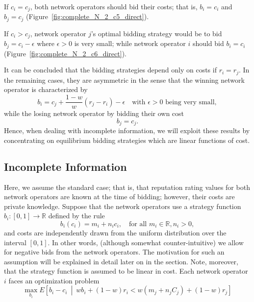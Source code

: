 If $c_i = c_j$, both network operators should bid their costs; that is, $b_i = c_i$ and $b_j = c_j$ (Figure~\ref{fig:complete_N_2_c5_direct}).

If $c_i > c_j$, network operator $j$'s optimal bidding strategy would be to bid $b_j = c_i - \epsilon$ where $\epsilon>0$ is very small; while network operator $i$ should bid $b_i = c_i$ (Figure~\ref{fig:complete_N_2_c6_direct}).

It can be concluded that the bidding strategies depend only on costs if $r_i = r_j$. In the remaining cases, they are asymmetric in the sense that the winning network operator is characterized by
\begin{equation*}
	b_i = c_j + \frac{1-w}{w}(r_j - r_i) - \epsilon \quad\text{with }\epsilon>0\text{ being very small},
\end{equation*}
while the losing network operator by bidding their own cost
\begin{equation*}
	b_j = c_j.
\end{equation*}
Hence, when dealing with incomplete information, we will exploit these results by concentrating on equilibrium bidding strategies which are linear functions of cost.

\subsection{Incomplete Information} %
\label{sub:incomplete_information_n_2_direct}
Here, we assume the standard case; that is, that reputation rating values for both network operators are known at the time of bidding; however, their costs are private knowledge. Suppose that the network operators use a strategy function $b_i: [0,1]\to\mathbb{R}$ defined by the rule
\begin{equation}
	\label{eq:pcomp_bidding_str_direct}
	b_i(c_i) = m_i + n_i c_i,\quad\text{for all } m_i\in\mathbb{R},n_i>0,
\end{equation}
and costs are independently drawn from the uniform distribution over the interval $[0,1]$. In other words, (although somewhat counter-intuitive) we allow for negative bids from the network operators. The motivation for such an assumption will be explained in detail later on in the section. Note, moreover, that the strategy function is assumed to be linear in cost. Each network operator $i$ faces an optimization problem
\begin{equation}
	\label{eq:pcomp_exp_utility_uc_direct}
	\max_{b_i}E \left[ b_i-c_i \:\middle\vert\: wb_i + (1-w)r_i < w(m_j + n_j C_j) + (1-w)r_j\right]
\end{equation}

